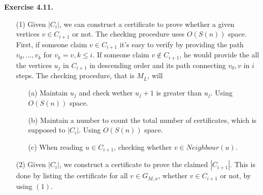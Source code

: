 \documentclass[a4paper]{article}
\newenvironment{exercise}[1]{
	\par
	\noindent\textbf{Exercise #1.}\quad
}{
	\par
	\bigskip
}
\begin{document}
\begin{exercise}{4.11}
\begin{itemize}
\begin{itemize}
\item[(1)] Given $|C_i|$, we can construct a certificate to prove whether a given vertices $v\in C_{i+1}$ or not. The checking procedure uses $O(S(n))$ space. First, if someone claim $v\in C_{i+1}$ it's easy to verify by providing the path $v_0,...,v_k$ for $v_k=v, k\leq i$. If someone claim $v\not\in C_{i+1}$, he would provide the all the vertices $u_j$ in $C_{i+1}$ in descending order and its path connecting $v_0, v$ in $i$ steps. The checking procedure, that is $M_{\overline{L}}$, will
    \begin{itemize}
    \item[(a)] Maintain $u_j$ and check wether $u_{j}+1$  is greater than $u_j$. Using $O(S(n))$ space.
    \item[(b)] Maintain a number to count the total number of certificates, which is supposed to $|C_{i}|$. Using $O(S(n))$ space.
    \item[(c)] When reading $u\in C_{i+1}$, checking whether $v\in Neighbour(u)$. 
    \end{itemize} 
\item[(2)] Given $|C_i|$, we construct a certificate to prove the claimed $|C_{i+1}|$. This is done by listing the certificate for all $v\in G_{M,x}$, whether $v\in C_{i+1}$ or not, by using $(1)$.
\end{itemize}
\end{itemize}

\end{exercise}
\end{document}
